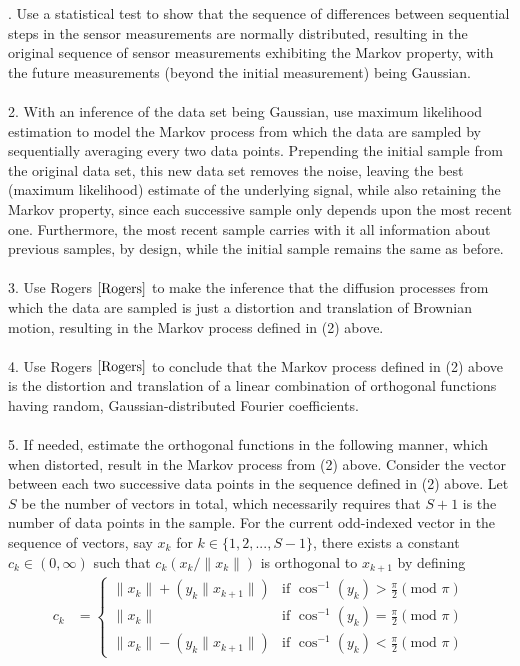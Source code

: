 \documentclass[11pt]{imsart}
\begin{document}
. Use a statistical test to show that the sequence of differences between sequential steps in the sensor measurements are normally distributed, resulting in the original sequence of sensor measurements exhibiting the Markov property, with the future measurements (beyond the initial measurement) being Gaussian.\\\\
2. With an inference of the data set being Gaussian, use maximum likelihood estimation to model the Markov process from which the data are sampled by sequentially averaging every two data points.  Pre\-pending the initial sample from the original data set, this new data set removes the noise, leaving the best (maximum likelihood) estimate of the underlying signal, while also retaining the Markov property, since each successive sample only depends upon the most recent one.  Furthermore, the most recent sample carries with it all information about previous samples, by design, while the initial sample remains the same as before.\\\\
3. Use Rogers $\cite[Section\ (I.5)\ \&\ Theorem\ (7.5)]{Rogers}$ to make the inference that the diffusion processes from which the data are sampled is just a distortion and translation of Brownian motion, resulting in the Markov process defined in (2) above.\\\\
4. Use Rogers $\cite[Theorem\ (6.1)]{Rogers}$ to conclude that the Markov process defined in (2) above is the distortion and translation of a linear combination of orthogonal functions having random, Gaussian-distributed Fourier coefficients.\\\\
5. If needed, estimate the orthogonal functions in the following manner, which when distorted, result in the Markov process from (2) above.  Consider the vector between each two successive data points in the sequence defined in (2) above.  Let $S$ be the number of vectors in total, which necessarily requires that $S+1$ is the number of data points in the sample.  For the current odd-indexed vector in the sequence of vectors, say $x_{k}$ for $k \in \{1,2,...,S-1\}$, there exists a constant $c_{k} \in (0,\infty)$ such that $c_{k}(x_{k}/\|x_{k}\|)$ is orthogonal to $x_{k+1}$ by defining
\begin{align*}
c_{k} &=
\begin{cases}
\|x_{k}\|+(y_{k}\|x_{k+1}\|)	& \text{if } \cos^{-1}(y_{k}) > \frac{\pi}{2} (\text{mod } \pi)\\
\|x_{k}\|	& \text{if } \cos^{-1}(y_{k}) = \frac{\pi}{2} (\text{mod } \pi)\\
\|x_{k}\|-(y_{k}\|x_{k+1}\|)	& \text{if } \cos^{-1}(y_{k}) < \frac{\pi}{2} (\text{mod } \pi)
\end{cases}
\end{align*}
\end{document}
